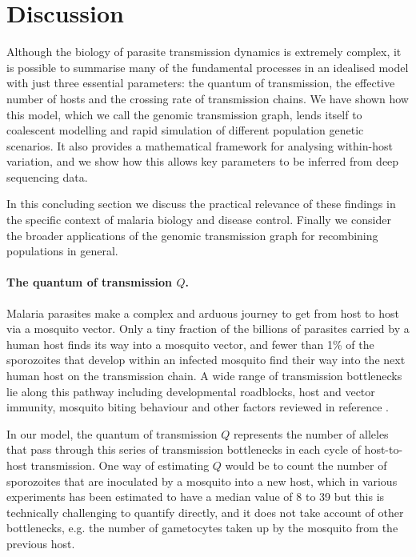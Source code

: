 \documentclass[_main.tex]{subfiles}
\begin{document}
\section*{Discussion}

Although the biology of parasite transmission dynamics is extremely complex, it is possible to summarise many of the fundamental processes in an idealised model with just three essential parameters: the quantum of transmission, the effective number of hosts and the crossing rate of transmission chains.  We have shown how this model, which we call the genomic transmission graph, lends itself to coalescent modelling and rapid simulation of different population genetic scenarios.  It also provides a mathematical framework for analysing within-host variation, and we show how this allows key parameters to be inferred from deep sequencing data.  

In this concluding section we discuss the practical relevance of these findings in the specific context of malaria biology and disease control.  Finally we consider the broader applications of the genomic transmission graph for recombining populations in general.

\paragraph{The quantum of transmission $Q$.}   Malaria parasites make a complex and arduous journey to get from host to host via a mosquito vector.  Only a tiny fraction of the billions of parasites carried by a human host finds its way into a mosquito vector, and fewer than 1\% of the sporozoites that develop within an infected mosquito find their way into the next human host on the transmission chain.  A wide range of transmission bottlenecks lie along this pathway including developmental roadblocks, host and vector immunity, mosquito biting behaviour and other factors reviewed in reference \cite{Graumans2020}.

In our model, the quantum of transmission $Q$ represents the number of alleles that pass through this series of transmission bottlenecks in each cycle of host-to-host transmission. One way of estimating $Q$ would be to count the number of sporozoites that are inoculated by a mosquito into a new host, which in various experiments has been estimated to have a median value of 8 to 39 \cite{Graumans2020} but this is technically challenging to quantify directly, and it does not take account of other bottlenecks, e.g. the number of gametocytes taken up by the mosquito from the previous host.  
\end{document}
